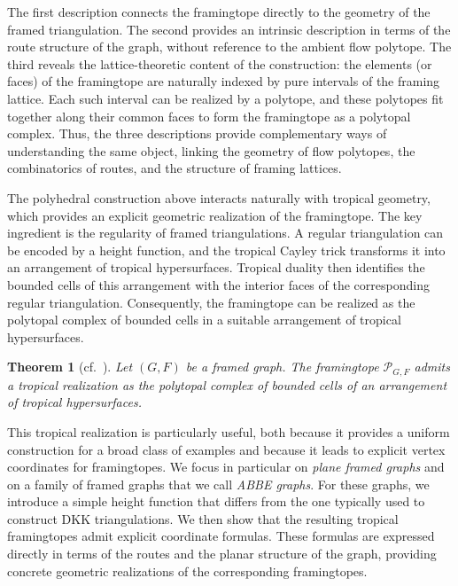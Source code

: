 \documentclass[12pt, reqno]{amsart}
\theoremstyle{plain}
\newtheorem*{theorem*}{Theorem}
\theoremstyle{definition}
\numberwithin{equation}{section}
\begin{document}
The first description connects the framingtope directly to the geometry of the framed triangulation. The second provides an intrinsic description in terms of the route structure of the graph, without reference to the ambient flow polytope. The third reveals the lattice-theoretic content of the construction: the elements (or faces) of the framingtope are naturally indexed by pure intervals of the framing lattice. Each such interval can be realized by a polytope, and these polytopes fit together along their common faces to form the framingtope as a polytopal complex. Thus, the three descriptions provide complementary ways of understanding the same object, linking the geometry of flow polytopes, the combinatorics of routes, and the structure of framing lattices.

The polyhedral construction above interacts naturally with tropical geometry, which provides an explicit geometric realization of the framingtope. The key ingredient is the regularity of framed triangulations. A regular triangulation can be encoded by a height function, and the tropical Cayley trick transforms it into an arrangement of tropical hypersurfaces. Tropical duality then identifies the bounded cells of this arrangement with the interior faces of the corresponding regular triangulation. Consequently, the framingtope can be realized as the polytopal complex of bounded cells in a suitable arrangement of tropical hypersurfaces.

\begin{theorem*}[cf.~]
Let $(G,F)$ be a framed graph. The framingtope $\mathscr{P}_{G,F}$ admits a tropical realization as the polytopal complex of bounded cells of an arrangement of tropical hypersurfaces.
\end{theorem*}

This tropical realization is particularly useful, both because it provides a uniform construction for a broad class of examples and because it leads to explicit vertex coordinates for framingtopes. We focus in particular on \emph{plane framed graphs} and on a family of framed graphs that we call \emph{ABBE graphs}. For these graphs, we introduce a simple height function that differs from the one typically used to construct DKK triangulations. We then show that the resulting tropical framingtopes admit explicit coordinate formulas. These formulas are expressed directly in terms of the routes and the planar structure of the graph, providing concrete geometric realizations of the corresponding framingtopes.
\end{document}

